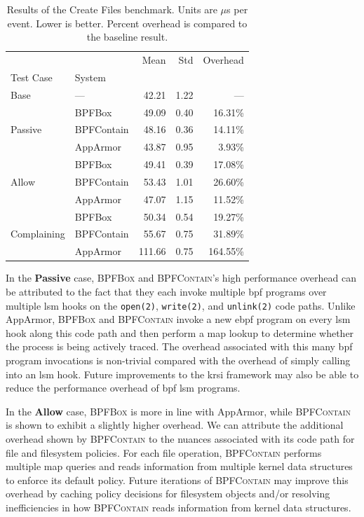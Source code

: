 \documentclass[
  fontsize=12pt,
  titlepage=firstiscover,
  paper=letter,
oneside,
  cleardoublepage=plain,
  parskip=half-,
  DIV=10,
  parindent,
  appendixprefix,
  chapterprefix,
  listof=totoc,
]{scrbook}
\newcommand{\bpfbox}{\textsc{BPFBox}}
\newcommand{\bpfcontain}{\textsc{BPFContain}}
\begin{document}
\begin{table}[ht!]
\centering
\footnotesize
\caption[Results of the Create Files benchmark]{Results of the Create Files benchmark. Units are $\mu$s per event. Lower is better. Percent overhead is compared to the baseline result.}
\label{tab:phoronix-create-files}
\begin{tabular}{llrrr}
\toprule
            &          &    Mean &   Std &  Overhead \\
Test Case & System &         &       &           \\
\midrule
Base & --- &   42.21 &  1.22 &       --- \\
\cline{1-5}
\multirow{3}{*}{Passive} & BPFBox &   49.09 &  0.40 &   16.31\% \\
            & BPFContain &   48.16 &  0.36 &   14.11\% \\
            & AppArmor &   43.87 &  0.95 &    3.93\% \\
\cline{1-5}
\multirow{3}{*}{Allow} & BPFBox &   49.41 &  0.39 &   17.08\% \\
            & BPFContain &   53.43 &  1.01 &   26.60\% \\
            & AppArmor &   47.07 &  1.15 &   11.52\% \\
\cline{1-5}
\multirow{3}{*}{Complaining} & BPFBox &   50.34 &  0.54 &   19.27\% \\
            & BPFContain &   55.67 &  0.75 &   31.89\% \\
            & AppArmor &  111.66 &  0.75 &  164.55\% \\
\bottomrule
\end{tabular}
\end{table}


In the \textbf{Passive} case, \bpfbox{} and \bpfcontain{}'s high performance overhead can
be attributed to the fact that they each invoke multiple \gls{bpf} programs over multiple
\gls{lsm} hooks on the \texttt{open(2)}, \texttt{write(2)}, and \texttt{unlink(2)} code
paths. Unlike AppArmor, \bpfbox{} and \bpfcontain{} invoke a new \gls{ebpf} program on
every \gls{lsm} hook along this code path and then perform a map lookup to determine whether
the process is being actively traced. The overhead associated with this many \gls{bpf}
program invocations is non-trivial compared with the overhead of simply calling into an
\gls{lsm} hook. Future improvements to the \gls{krsi} framework may also be able to reduce
the performance overhead of \gls{bpf} \gls{lsm} programs.

In the \textbf{Allow} case, \bpfbox{} is more in line with AppArmor, while \bpfcontain{}
is shown to exhibit a slightly higher overhead. We can attribute the additional
overhead shown by \bpfcontain{} to the nuances associated with its code path for file and
filesystem policies. For each file operation, \bpfcontain{} performs multiple map queries
and reads information from multiple kernel data structures to enforce its default policy.
Future iterations of \bpfcontain{} may improve this overhead by caching policy decisions
for filesystem objects and/or resolving inefficiencies in how \bpfcontain{} reads
information from kernel data structures.
\end{document}
